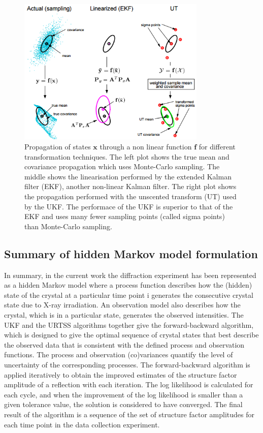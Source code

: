 \begin{figure}[ht!]
    \centering
    \includegraphics[width=0.8\textwidth]{figures/datared/StateTransformation.png}
    \caption[Propagation of states through a non linear function for different transformation techniques.]{Propagation of states $\mathbf{x}$ through a non linear function $\mathbf{f}$ for different transformation techniques.
    The left plot shows the true mean and covariance propagation which uses Monte-Carlo sampling.
    The middle shows the linearisation performed by the extended Kalman filter (EKF), another non-linear Kalman filter.
    The right plot shows the propagation performed with the unscented transform (UT) used by the UKF.
    The performace of the UKF is superior to that of the EKF and uses many fewer sampling points (called sigma points) than Monte-Carlo sampling.}
    \label{fig:State propagation for different filters}
\end{figure}

\subsection{Summary of hidden Markov model formulation}
\label{sub:Summary of hidden Markov model formulation}
In summary, in the current work the diffraction experiment has been represented as a hidden Markov model where a process function describes how the (hidden) state of the crystal at a particular time point i generates the consecutive crystal state due to X-ray irradiation.
An observation model also describes how the crystal, which is in a particular state, generates the observed intensities.
The UKF and the URTSS algorithms together give the forward-backward algorithm, which is designed to give the optimal sequence of crystal states that best describe the observed data that is consistent with the defined process and observation functions.
The process and observation (co)variances quantify the level of uncertainty of the corresponding processes.
The forward-backward algorithm is applied iteratively to obtain the improved estimates of the structure factor amplitude of a reflection with each iteration.
The log likelihood is calculated for each cycle, and when the improvement of the log likelihood is smaller than a given tolerance value, the solution is considered to have converged.
The final result of the algorithm is a sequence of the set of structure factor amplitudes for each time point in the data collection experiment.
